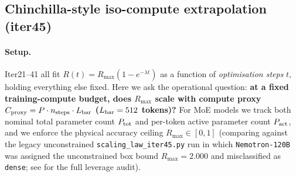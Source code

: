 \subsection{Chinchilla-style iso-compute extrapolation (iter45)}
\label{sec:scaling-law-iter45}
\label{sec:iter45}
\paragraph{Setup.} Iter21--41 all fit $R(t)=R_{\max}(1-e^{-\lambda t})$ as a function of \emph{optimisation steps} $t$, holding everything else fixed. Here we ask the operational question: \textbf{at a fixed training-compute budget, does $R_{\max}$ scale with compute proxy $C_{\mathrm{proxy}} = P \cdot n_{\rm steps} \cdot L_{\rm bar}$ ($L_{\rm bar}=512$ tokens)?} For MoE models we track both nominal total parameter count $P_{\rm tot}$ and per-token active parameter count $P_{\rm act}$, and we enforce the physical accuracy ceiling $R_{\max} \in [0, 1]$ (comparing against the legacy unconstrained \texttt{scaling\_law\_iter45.py} run in which \texttt{Nemotron-120B} was assigned the unconstrained box bound $R_{\max}=2.000$ and misclassified as \texttt{dense}; see  for the full leverage audit).
